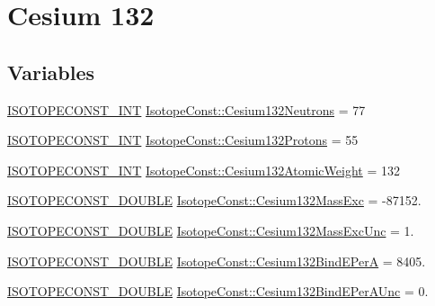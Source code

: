 \hypertarget{group___isotope_const-_cesium-_cs132}{}\section{Cesium 132}
\label{group___isotope_const-_cesium-_cs132}
\subsection*{Variables}
\begin{DoxyCompactItemize}
\item 
\mbox{\hyperlink{group___isotope_const-_macros_ga5f18360b3e99483a35c32d789e62621c}{I\+S\+O\+T\+O\+P\+E\+C\+O\+N\+S\+T\+\_\+\+I\+NT}} \mbox{\hyperlink{group___isotope_const-_cesium-_cs132_ga2f324596971845acc6eb5ed66293a732}{Isotope\+Const\+::\+Cesium132\+Neutrons}} = 77
\item 
\mbox{\hyperlink{group___isotope_const-_macros_ga5f18360b3e99483a35c32d789e62621c}{I\+S\+O\+T\+O\+P\+E\+C\+O\+N\+S\+T\+\_\+\+I\+NT}} \mbox{\hyperlink{group___isotope_const-_cesium-_cs132_ga9fd4b6f5ef30a589c721311ac0ff06fd}{Isotope\+Const\+::\+Cesium132\+Protons}} = 55
\item 
\mbox{\hyperlink{group___isotope_const-_macros_ga5f18360b3e99483a35c32d789e62621c}{I\+S\+O\+T\+O\+P\+E\+C\+O\+N\+S\+T\+\_\+\+I\+NT}} \mbox{\hyperlink{group___isotope_const-_cesium-_cs132_gafecd59e1c99597a09479d1a4425c550f}{Isotope\+Const\+::\+Cesium132\+Atomic\+Weight}} = 132
\item 
\mbox{\hyperlink{group___isotope_const-_macros_ga8f45a7272ce02c0b4c65c44636ed719a}{I\+S\+O\+T\+O\+P\+E\+C\+O\+N\+S\+T\+\_\+\+D\+O\+U\+B\+LE}} \mbox{\hyperlink{group___isotope_const-_cesium-_cs132_ga5d27d5ccb4bcd402373c0735a06ea04e}{Isotope\+Const\+::\+Cesium132\+Mass\+Exc}} = -\/87152.
\item 
\mbox{\hyperlink{group___isotope_const-_macros_ga8f45a7272ce02c0b4c65c44636ed719a}{I\+S\+O\+T\+O\+P\+E\+C\+O\+N\+S\+T\+\_\+\+D\+O\+U\+B\+LE}} \mbox{\hyperlink{group___isotope_const-_cesium-_cs132_ga516d4a40267734a4a466c6c6f3a99b3b}{Isotope\+Const\+::\+Cesium132\+Mass\+Exc\+Unc}} = 1.
\item 
\mbox{\hyperlink{group___isotope_const-_macros_ga8f45a7272ce02c0b4c65c44636ed719a}{I\+S\+O\+T\+O\+P\+E\+C\+O\+N\+S\+T\+\_\+\+D\+O\+U\+B\+LE}} \mbox{\hyperlink{group___isotope_const-_cesium-_cs132_ga061006d5c178048ad294f316de4ee38c}{Isotope\+Const\+::\+Cesium132\+Bind\+E\+PerA}} = 8405.
\item 
\mbox{\hyperlink{group___isotope_const-_macros_ga8f45a7272ce02c0b4c65c44636ed719a}{I\+S\+O\+T\+O\+P\+E\+C\+O\+N\+S\+T\+\_\+\+D\+O\+U\+B\+LE}} \mbox{\hyperlink{group___isotope_const-_cesium-_cs132_gadb864b8bfb6d12631fd892d5b1439730}{Isotope\+Const\+::\+Cesium132\+Bind\+E\+Per\+A\+Unc}} = 0.

\end{DoxyCompactItemize}
